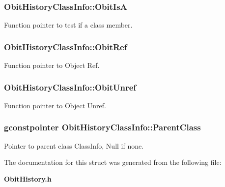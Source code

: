 \subsubsection{ {\bf Obit\-History\-Class\-Info::Obit\-Is\-A}}\label{structObitHistoryClassInfo_o12}


Function pointer to test if a class member. 

\subsubsection{ {\bf Obit\-History\-Class\-Info::Obit\-Ref}}\label{structObitHistoryClassInfo_o10}


Function pointer to Object Ref. 

\subsubsection{ {\bf Obit\-History\-Class\-Info::Obit\-Unref}}\label{structObitHistoryClassInfo_o11}


Function pointer to Object Unref. 

\subsubsection{\setlength{\rightskip}{0pt plus 5cm}gconstpointer {\bf Obit\-History\-Class\-Info::Parent\-Class}}\label{structObitHistoryClassInfo_o3}


Pointer to parent class Class\-Info, Null if none. 



The documentation for this struct was generated from the following file:\begin{CompactItemize}
\item 
{\bf Obit\-History.h}\end{CompactItemize}
